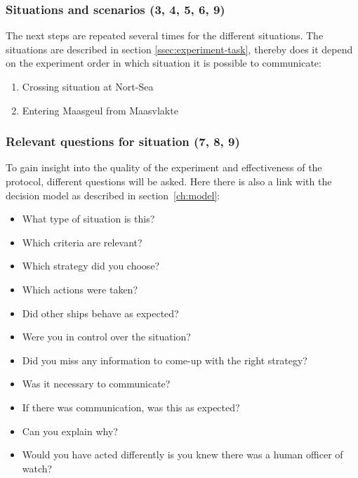 \subsubsection{Situations and scenarios (3, 4, 5, 6, 9)}
The next steps are repeated several times for the different situations. The situations are described in section \ref{ssec:experiment-task}, thereby does it depend on the experiment order in which situation it is possible to communicate:
\begin{enumerate}
	\item Crossing situation at Nort-Sea
	\item Entering Maasgeul from Maasvlakte
\end{enumerate}

\subsubsection{Relevant questions for situation (7, 8, 9)}
To gain insight into the quality of the experiment and effectiveness of the protocol, different questions will be asked. Here there is also a link with the decision model as described in section~\ref{ch:model}:
\begin{itemize}
	\item What type of situation is this?
	\item Which criteria are relevant?
	\item Which strategy did you choose?
	\item Which actions were taken?
	\item Did other ships behave as expected?
	\item Were you in control over the situation?
	\item Did you miss any information to come-up with the right strategy?
	\item Was it necessary to communicate?
	\item If there was communication, was this as expected?
	\item Can you explain why?
	\item Would you have acted differently is you knew there was a human officer of watch?
\end{itemize}

